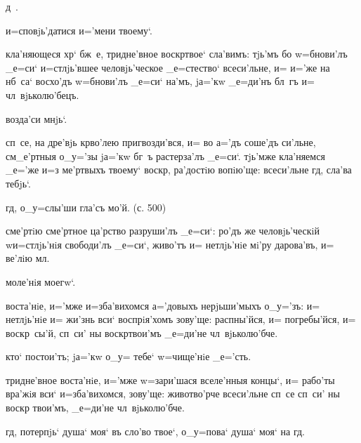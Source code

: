 
д~.%

и=сповjь'датися и='мени твоему`.

кла'няющеся хр` бж~е, тридне'вное воскр твое` 
сла'вимъ: тjь'мъ бо w=бнови'лъ _е=си` и=стлjь'вшее 
человjь'ческое _е=стество` всеси'льне, и= и='же на нб~са` 
восхо'дъ w=бнови'лъ _е=си` на'мъ, jа='кw _е=ди'нъ бл~гъ 
и= чл~вjьколю'бецъ.

возда'си мнjь`.

сп~се, на дре'вjь кр во'лею пригвозди'вся, и= во 
а='дъ соше'дъ си'льне, см_е'ртныя о_у='зы jа='кw бг~ъ 
растерза'лъ _е=си`. тjь'мже кла'няемся _е='же и=з\ъ 
ме'ртвыхъ твоему` воскр, ра'достiю вопiю'ще: 
всеси'льне гд, сла'ва тебjь`.

гд, о_у=слы'ши гла'съ мо'й. (с. 500)

сме'ртiю сме'ртное ца'рство разруши'лъ _е=си`: ро'дъ же 
человjь'ческiй w\т и=стлjь'нiя свободи'лъ _е=си`, живо'тъ 
и= нетлjь'нiе мi'ру дарова'въ, и= ве'лiю мл.


моле'нiя моегw`.

воста'нiе, и='мже и=зба'вихомся а='довыхъ нерjьши'мыхъ 
о_у='зъ: и= нетлjь'нiе и= жи'знь вси` воспрiя'хомъ 
зову'ще: распны'йся, и= погребы'йся, и= воскр~сы'й, 
сп~си' ны воскр твои'мъ _е=ди'не чл~вjьколю'бче.

кто` постои'тъ; jа='кw о_у= тебе` w=чище'нiе _е='сть.

тридне'вное воста'нiе, и='мже w=зари'шася вселе'нныя 
концы`, и= рабо'ты вра'жiя вси` и=зба'вихомся, зову'ще: 
животво'рче всеси'льне сп~се сп~си' ны воскр 
твои'мъ, _е=ди'не чл~вjьколю'бче.

гд, потерпjь` душа` моя` въ сло'во твое`, о_у=пова` 
душа` моя` на гд.

